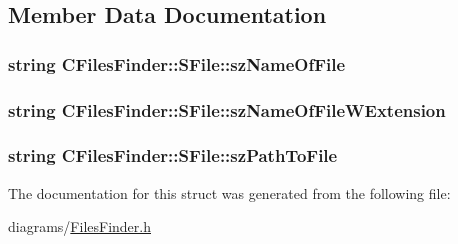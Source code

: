\subsection{Member Data Documentation}
\hypertarget{struct_c_files_finder_1_1_s_file_aaed5de486dfbdb594746e4fd13c65074}{
\subsubsection[{sz\+Name\+Of\+File}]{\setlength{\rightskip}{0pt plus 5cm}string C\+Files\+Finder\+::\+S\+File\+::sz\+Name\+Of\+File}}\label{struct_c_files_finder_1_1_s_file_aaed5de486dfbdb594746e4fd13c65074}
\hypertarget{struct_c_files_finder_1_1_s_file_a7ceceb85e185f30be5476a3d150a2aba}{
\subsubsection[{sz\+Name\+Of\+File\+W\+Extension}]{\setlength{\rightskip}{0pt plus 5cm}string C\+Files\+Finder\+::\+S\+File\+::sz\+Name\+Of\+File\+W\+Extension}}\label{struct_c_files_finder_1_1_s_file_a7ceceb85e185f30be5476a3d150a2aba}
\hypertarget{struct_c_files_finder_1_1_s_file_aa0ec885df98370ebdd2fdb429ce76adf}{
\subsubsection[{sz\+Path\+To\+File}]{\setlength{\rightskip}{0pt plus 5cm}string C\+Files\+Finder\+::\+S\+File\+::sz\+Path\+To\+File}}\label{struct_c_files_finder_1_1_s_file_aa0ec885df98370ebdd2fdb429ce76adf}


The documentation for this struct was generated from the following file\+:\begin{DoxyCompactItemize}
\item 
diagrams/\hyperlink{_files_finder_8h}{Files\+Finder.\+h}\end{DoxyCompactItemize}
